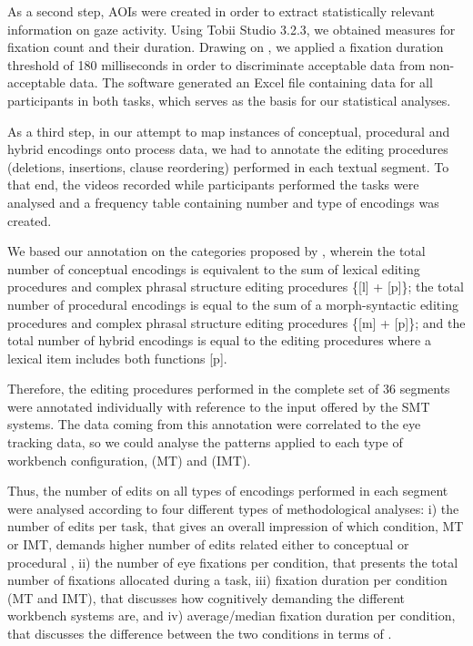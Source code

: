 \documentclass[output=paper]{langsci/langscibook}
\begin{document}
As a second step, AOIs were created in order to extract statistically relevant information on gaze activity. Using Tobii Studio 3.2.3, we obtained measures for fixation count and their duration. Drawing on \citet[105]{Sjorup2013}, we applied a fixation duration threshold of 180 milliseconds in order to discriminate acceptable data from non-acceptable data. The software generated an Excel file containing data for all participants in both tasks, which serves as the basis for our statistical analyses.



As a third step, in our attempt to map instances of conceptual, procedural and hybrid encodings onto  process data, we had to annotate the editing procedures (deletions, insertions, clause reordering) performed in each textual segment. To that end, the videos recorded while participants performed the  tasks were analysed and a frequency table containing number and type of encodings was created. 



We based our annotation on the categories proposed by \citet{alves2013}, wherein the total number of conceptual encodings is equivalent to the sum of lexical editing procedures and complex phrasal structure editing procedures \{[l] + [p]\}; the total number of procedural encodings is equal to the sum of a morph-syntactic editing procedures and complex phrasal structure editing procedures \{[m] + [p]\}; and the total number of hybrid encodings is equal to the editing procedures where a lexical item includes both  functions [p]. 



Therefore, the editing procedures performed in the complete set of 36 segments were annotated individually with reference to the input offered by the SMT systems.  The data coming from this annotation were correlated to the eye tracking data, so we could analyse the  patterns applied to each type of workbench configuration, (MT) and (IMT). 



Thus, the number of edits on all types of encodings performed in each segment were analysed according to four different types of methodological analyses: i) the number of  edits per task, that gives an overall impression of which condition, MT or IMT, demands higher number of  edits related either to conceptual or procedural , ii) the number of eye fixations per condition, that presents the total number of fixations allocated during a  task, iii) fixation duration per condition (MT and IMT), that discusses how cognitively demanding the different  workbench systems are, and iv) average/median fixation duration per condition, that discusses the difference between the two  conditions in terms of .   
\end{document}

